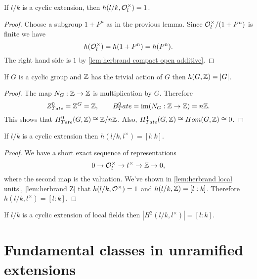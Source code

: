 \begin{lemma}\label{lem:herbrand local units}
	If $l/k$ is a cyclic extension, then $h(l/k, {\mathcal O}_l^\times) = 1$.
\end{lemma}

\begin{proof}
	Choose a subgroup $1+P^n$ as in the provious lemma.
	Since ${\mathcal O}_l^\times / (1+P^n)$ is finite we have
	\[
		h({\mathcal O}_l^\times) = h(1+P^n) = h(P^n).
	\]
	The right hand side is $1$ by \ref{lem:herbrand compact open additive}.
\end{proof}

\begin{lemma} \label{lem:herbrand Z}
	If $G$ is a cyclic group and ${\mathbb Z}$ has the trivial action of $G$ then $h(G,{\mathbb Z}) = |G|$.
\end{lemma}

\begin{proof}
	The map	$N_G : {\mathbb Z} \to {\mathbb Z}$ is multiplication by $G$.
	Therefore
	\[
		Z^0_{Tate} = {\mathbb Z}^G = {\mathbb Z}, \qquad
		B^0_Tate = \mathrm{im}(N_G : {\mathbb Z} \to {\mathbb Z}) = n{\mathbb Z}.
	\]
	This shows that $H^0_{Tate}(G,{\mathbb Z})\cong {\mathbb Z} / n{\mathbb Z}$.
	Also,	$H^1_{Tate}(G,{\mathbb Z}) \cong Hom(G,{\mathbb Z}) \cong 0$.
\end{proof}

\begin{lemma} \label{lem:herbrand local l*}
	If $l/k$ is a cyclic extension then $h(l/k, l^\times)= [l:k]$.
\end{lemma}

\begin{proof}
	We have a short exact sequence of representations
	\[
		0 \to {\mathcal O}_l^\times \to l^\times \to {\mathbb Z} \to 0,
 	\]
	where the second map is the valuation.
	We've shown in \ref{lem:herbrand local units}, \ref{lem:herbrand Z}
	that $h(l/k,{\mathcal O}^\times)=1$ and $h(l/k,{\mathbb Z}) = [l:k]$.
	Therefore $h(l/k,l^\times) = [l:k]$.
\end{proof}


\begin{lemma} \label{lem:local H2 l*}
	If $l/k$ is a cyclic extension of local fields then $|H^2(l/k,l^\times)| = [l:k]$.
\end{lemma}







\section{Fundamental classes in unramified extensions}

